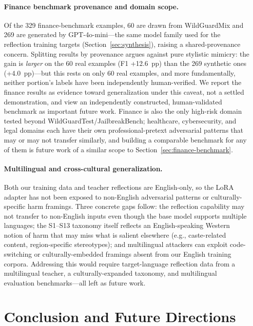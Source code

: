 \documentclass[Superintelligence,article,submit,pdftex,moreauthors]{Definitions/mdpi}
\begin{document}
\paragraph{Finance benchmark provenance and domain scope.}
Of the 329 finance-benchmark examples, 60 are drawn from WildGuardMix and 269 are generated by GPT-4o-mini---the same model family used for the reflection training targets (Section~\ref{sec:synthesis}), raising a shared-provenance concern. Splitting results by provenance argues against pure stylistic mimicry: the gain is \emph{larger} on the 60 real examples (F1 +12.6~pp) than the 269 synthetic ones (+4.0~pp)---but this rests on only 60 real examples, and more fundamentally, neither portion's labels have been independently human-verified. We report the finance results as evidence toward generalization under this caveat, not a settled demonstration, and view an independently constructed, human-validated benchmark as important future work. Finance is also the only high-risk domain tested beyond WildGuardTest/JailbreakBench; healthcare, cybersecurity, and legal domains each have their own professional-pretext adversarial patterns that may or may not transfer similarly, and building a comparable benchmark for any of them is future work of a similar scope to Section~\ref{sec:finance-benchmark}.

\paragraph{Multilingual and cross-cultural generalization.}
Both our training data and teacher reflections are English-only, so the LoRA adapter has not been exposed to non-English adversarial patterns or culturally-specific harm framings. Three concrete gaps follow: the reflection capability may not transfer to non-English inputs even though the base model supports multiple languages; the S1--S13 taxonomy itself reflects an English-speaking Western notion of harm that may miss what is salient elsewhere (e.g., caste-related content, region-specific stereotypes); and multilingual attackers can exploit code-switching or culturally-embedded framings absent from our English training corpora. Addressing this would require target-language reflection data from a multilingual teacher, a culturally-expanded taxonomy, and multilingual evaluation benchmarks---all left as future work.

\section{Conclusion and Future Directions}
\end{document}
